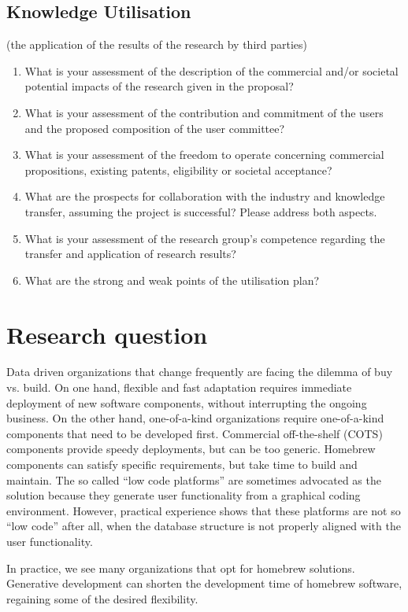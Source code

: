 \documentclass{elsarticle}
\begin{document}
\subsection{Knowledge Utilisation} (the application of the results of the research by third parties)
\begin{enumerate}
   \item  	What is your assessment of the description of the commercial and/or societal potential impacts of the research given in the proposal?
   \item 	What is your assessment of the contribution and commitment of the users and the proposed composition of the user committee?
   \item 	What is your assessment of the freedom to operate concerning commercial propositions, existing patents, eligibility or societal acceptance? 
   \item 	What are the prospects for collaboration with the industry and knowledge transfer, assuming the project is successful? Please address both aspects.
   \item 	What is your assessment of the research group's competence regarding the transfer and application of research results?
   \item 	What are the strong and weak points of the utilisation plan?   
\end{enumerate}

\section{Research question}
\label{sct:Research question}
   Data driven organizations that change frequently are facing the dilemma of buy vs. build.
   On one hand, flexible and fast adaptation requires immediate deployment of new software components, without interrupting the ongoing business.
   On the other hand, one-of-a-kind organizations require one-of-a-kind components that need to be developed first.
   Commercial off-the-shelf (COTS) components provide speedy deployments, but can be too generic.
   Homebrew components can satisfy specific requirements, but take time to build and maintain.
   The so called ``low code platforms'' are sometimes advocated as the solution
   because they generate user functionality from a graphical coding environment.
   However, practical experience shows that these platforms are not so ``low code'' after all,
   when the database structure is not properly aligned with the user functionality.
 
   In practice, we see many organizations that opt for homebrew solutions.
   Generative development can shorten the development time of homebrew software, regaining some of the desired flexibility.
\end{document}
